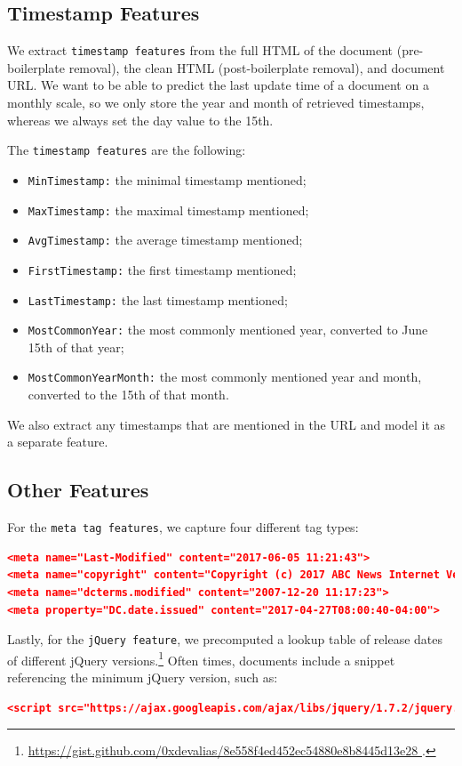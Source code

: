 \subsection{Timestamp Features}
We extract \texttt{timestamp features} from the full HTML of the document (pre-boilerplate removal), the clean HTML (post-boilerplate removal), and document URL. We want to be able to predict the last update time of a document on a monthly scale, so we only store the year and month of retrieved timestamps, whereas we always set the day value to the 15th.

The \texttt{timestamp features} are the following:
\begin{itemize}
	\item \texttt{MinTimestamp:} the minimal timestamp mentioned;
    \item \texttt{MaxTimestamp:} the maximal timestamp mentioned;
    \item \texttt{AvgTimestamp:} the average timestamp mentioned;
    \item \texttt{FirstTimestamp:} the first timestamp mentioned;
    \item \texttt{LastTimestamp:} the last timestamp mentioned;
    \item \texttt{MostCommonYear:} the most commonly mentioned year, converted to June 15th of that year;
    \item \texttt{MostCommonYearMonth:} the most commonly mentioned year and month, converted to the 15th of that month.
\end{itemize}

We also extract any timestamps that are mentioned in the URL and model it as a separate feature.

\subsection{Other Features}
For the \texttt{meta tag features}, we capture four different tag types:

\begin{lstlisting}[language=json]
<meta name="Last-Modified" content="2017-06-05 11:21:43">
<meta name="copyright" content="Copyright (c) 2017 ABC News Internet Ventures">
<meta name="dcterms.modified" content="2007-12-20 11:17:23">
<meta property="DC.date.issued" content="2017-04-27T08:00:40-04:00">
\end{lstlisting}

Lastly, for the \texttt{jQuery feature}, we precomputed a lookup table of release dates of different jQuery versions.\footnote{\url{https://gist.github.com/0xdevalias/8e558f4ed452ec54880e8b8445d13e28 }.} Often times, documents include a snippet referencing the minimum jQuery version, such as:
\begin{lstlisting}[language=json]
<script src="https://ajax.googleapis.com/ajax/libs/jquery/1.7.2/jquery.min.js"></script>
\end{lstlisting}

